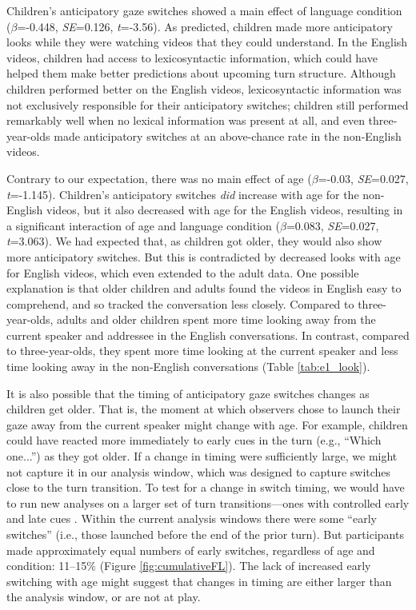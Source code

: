 \documentclass[authoryear, 12pt]{elsarticle}
\begin{document}
Children's anticipatory gaze switches showed a main effect of language condition (\textit{$\beta$}=-0.448, \textit{SE}=0.126, \textit{t}=-3.56). As predicted, children made more anticipatory looks while they were watching videos that they could understand. In the English videos, children had access to lexicosyntactic information, which could have helped them make better predictions about upcoming turn structure. Although children performed better on the English videos, lexicosyntactic information was not exclusively responsible for their anticipatory switches; children still performed remarkably well when no lexical information was present at all, and even three-year-olds made anticipatory switches at an above-chance rate in the non-English videos.

Contrary to our expectation, there was no main effect of age (\textit{$\beta$}=-0.03, \textit{SE}=0.027, \textit{t}=-1.145). Children's anticipatory switches \textit{did} increase with age for the non-English videos, but it also decreased with age for the English videos, resulting in a significant interaction of age and language condition (\textit{$\beta$}=0.083, \textit{SE}=0.027, \textit{t}=3.063). We had expected that, as children got older, they would also show more anticipatory switches. But this is contradicted by decreased looks with age for English videos, which even extended to the adult data. One possible explanation is that older children and adults found the videos in English easy to comprehend, and so tracked the conversation less closely. Compared to three-year-olds, adults and older children spent more time looking away from the current speaker and addressee in the English conversations. In contrast, compared to three-year-olds, they spent more time looking at the current speaker and less time looking away in the non-English conversations (Table \ref{tab:e1_look}).

It is also possible that the timing of anticipatory gaze switches changes as children get older. That is, the moment at which observers chose to launch their gaze away from the current speaker might change with age. For example, children could have reacted more immediately to early cues in the turn (e.g., ``Which one...'') as they got older. If a change in timing were sufficiently large, we might not capture it in our analysis window, which was designed to capture switches close to the turn transition. To test for a change in switch timing, we would have to run new analyses on a larger set of turn transitions---ones with controlled early and late cues \citep[see, e.g.,][]{bogelsmagyariInPrep}. Within the current analysis windows there were some ``early switches'' (i.e., those launched before the end of the prior turn). But participants made approximately equal numbers of early switches, regardless of age and condition: 11--15\% (Figure \ref{fig:cumulativeFL}). The lack of increased early switching with age might suggest that changes in timing are either larger than the analysis window, or are not at play.
\end{document}
